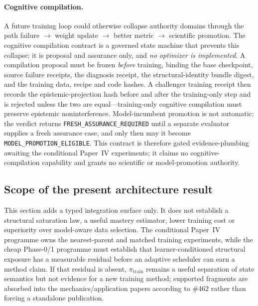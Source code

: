 \paragraph{Cognitive compilation.}
A future training loop could otherwise collapse authority domains through the path failure $\to$ weight update $\to$ better metric $\to$ scientific promotion. The cognitive compilation contract is a governed state machine that prevents this collapse; it is proposal and assurance only, and \emph{no optimizer is implemented}. A compilation proposal must be frozen \emph{before} training, binding the base checkpoint, source failure receipts, the diagnosis receipt, the structural-identity bundle digest, and the training data, recipe and code hashes. A challenger training receipt then records the epistemic-projection hash before and after the training-only step and is rejected unless the two are equal---training-only cognitive compilation must preserve epistemic noninterference. Model-incumbent promotion is not automatic: the verdict returns \texttt{FRESH\_ASSURANCE\_REQUIRED} until a separate evaluator supplies a fresh assurance case, and only then may it become \texttt{MODEL\_PROMOTION\_ELIGIBLE}. This contract is therefore gated evidence-plumbing awaiting the conditional Paper~IV experiments; it claims no cognitive-compilation capability and grants no scientific or model-promotion authority.

\subsection{Scope of the present architecture result}

This section adds a typed integration surface only.  It does not establish a structural saturation law, a useful mastery estimator, lower training cost or superiority over model-aware data selection.  The conditional Paper~IV programme owns the nearest-parent and matched training experiments, while the cheap Phase-0/1 programme must establish that learner-conditioned structural exposure has a measurable residual before an adaptive scheduler can earn a method claim.  If that residual is absent, $\pi_{\mathrm{train}}$ remains a useful separation of state semantics but not evidence for a new training method; supported fragments are absorbed into the mechanics/application papers according to \#462 rather than forcing a standalone publication.

